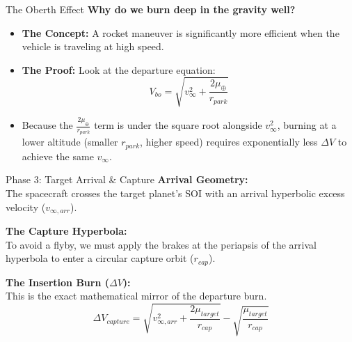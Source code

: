 \documentclass[11pt]{beamer}
\begin{document}
\begin{frame}{The Oberth Effect}
    \textbf{Why do we burn deep in the gravity well?}
    
    \vspace{0.5cm}
    \begin{itemize}
        \item \textbf{The Concept:} A rocket maneuver is significantly more efficient when the vehicle is traveling at high speed.
        \item \textbf{The Proof:} Look at the departure equation:
        $$ V_{bo} = \sqrt{v_\infty^2 + \frac{2\mu_{\oplus}}{r_{park}}} $$
        \item Because the $\frac{2\mu_{\oplus}}{r_{park}}$ term is under the square root alongside $v_\infty^2$, burning at a lower altitude (smaller $r_{park}$, higher speed) requires exponentially less $\Delta V$ to achieve the same $v_\infty$.
    \end{itemize}
\end{frame}

\begin{frame}{Phase 3: Target Arrival \& Capture}
    \textbf{Arrival Geometry:} \\
    The spacecraft crosses the target planet's SOI with an arrival hyperbolic excess velocity ($v_{\infty, arr}$). 
    
    \vspace{0.3cm}
    \textbf{The Capture Hyperbola:} \\
    To avoid a flyby, we must apply the brakes at the periapsis of the arrival hyperbola to enter a circular capture orbit ($r_{cap}$).
    
    \vspace{0.3cm}
    \textbf{The Insertion Burn ($\Delta V$):} \\
    This is the exact mathematical mirror of the departure burn.
    \begin{equation}
        \Delta V_{capture} = \sqrt{v_{\infty, arr}^2 + \frac{2\mu_{target}}{r_{cap}}} - \sqrt{\frac{\mu_{target}}{r_{cap}}}
    \end{equation}
\end{frame}
\end{document}
